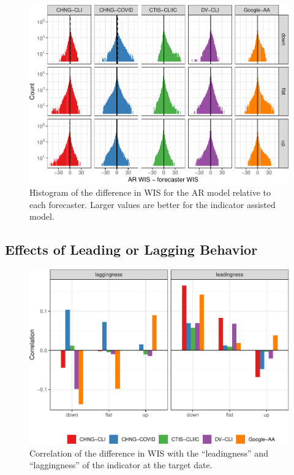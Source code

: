 \documentclass[9pt,twocolumn,twoside,lineno]{pnas-new}
\begin{document}
\begin{figure}[t]
  \includegraphics[width=\columnwidth]{fig/upswing-histogram-1.pdf}
  \caption{Histogram of the difference in WIS for the AR model relative to each
    forecaster. Larger values are better for the indicator assisted model.}
  \label{fig:up-down-flat}
\end{figure}

\subsection{Effects of Leading or Lagging Behavior}

\begin{figure}[t]
  \includegraphics[width=\columnwidth]{fig/leading-and-lagging-1.pdf}
  \caption{Correlation of the difference in WIS with the ``leadingness'' and
    ``laggingness'' of the indicator at the target date.}
  \label{fig:leading-lagging}
\end{figure}
\end{document}
